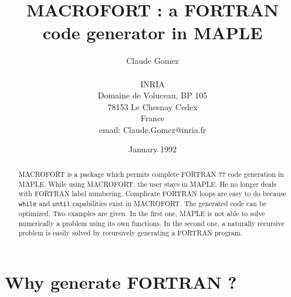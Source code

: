 
%
%

\textheight=23cm \textwidth=16cm
\topmargin=-1cm
\oddsidemargin=0pt \evensidemargin=0pt \marginparwidth=2cm

\def\four!{\!\!\!\!}
\def\eg{\hbox{e.g.}\ }
\def\is{\stackrel{\rm def}{=}}
\def\ie{\hbox{i.e.}\ }
\def\R{I\!\!R}

\title{MACROFORT : a FORTRAN code generator in MAPLE}

\author{Claude Gomez \\\\
        {\small INRIA} \\
        {\small Domaine de Voluceau, BP 105} \\
        {\small 78153 Le Chesnay Cedex} \\
        {\small France} \\
        {\small email: Claude.Gomez@inria.fr}}

\date{January 1992}



\maketitle

\begin{abstract}
MACROFORT is a package which permits complete FORTRAN 77 code
generation in MAPLE. 
While using MACROFORT, the user stays in MAPLE. He no longer
deals with FORTRAN label numbering. Complicate FORTRAN loops are easy 
to do because 
{\tt while} and {\tt until} capabilities exist in MACROFORT. The generated
code can be optimized. Two examples are given. In the first one,
MAPLE is not able to solve numerically a problem using its own 
functions. In the second one, a naturally recursive problem is easily solved
by recursively generating a FORTRAN program.
\end{abstract}

\section{Why generate FORTRAN ?}
\label{whyf}

